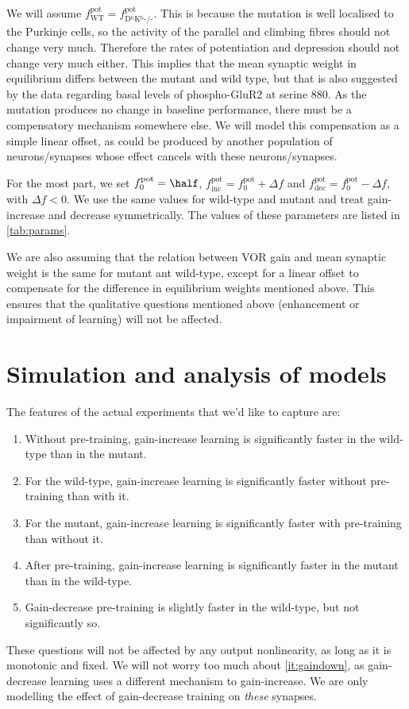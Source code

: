 \documentclass[12pt]{article}
\newcommand{\pot}{^{\text{pot}}}
\newcommand{\norm}{_0}
\newcommand{\inc}{_{\text{inc}}}
\newcommand{\dec}{_{\text{dec}}}
\newcommand{\wt}{_{\text{WT}}}
\newcommand{\ko}{_{\text{D$^\mathrm{b}$K$^\mathrm{b}$-/-}}}
\begin{document}
We will assume $f\pot\wt=f\pot\ko$.
This is because the mutation is well localised to the Purkinje cells, so the activity of the parallel and climbing fibres should not change very much.
Therefore the rates of potentiation and depression should not change very much either.
This implies that the mean synaptic weight in equilibrium differs between the mutant and wild type, but that is also suggested by the data regarding basal levels of phospho-GluR2 at serine 880.
As the mutation produces no change in baseline performance, there must be a compensatory mechanism somewhere else.
We will model this compensation as a simple linear offset, as could be produced by another population of neurons/synapses whose effect cancels with these neurons/synapses.

For the most part, we set $f\pot\norm=\half$, $f\pot\inc=f\pot\norm+\Delta f$ and $f\pot\dec=f\pot\norm-\Delta f$, with $\Delta f<0$.
We use the same values for wild-type and mutant and treat gain-increase and decrease symmetrically.
The values of these parameters are listed in \autoref{tab:params}.

We are also assuming that the relation between VOR gain and mean synaptic weight is the same for mutant ant wild-type, except for a linear offset to compensate for the difference in equilibrium weights mentioned above.
This ensures that the qualitative questions mentioned above (enhancement or impairment of learning) will not be affected.




\section{Simulation and analysis of models}\label{sec:results}

The features of the actual experiments that we'd like to capture are:
\begin{enumerate}
  \item Without pre-training, gain-increase learning is significantly faster in the wild-type than in the mutant.
  \item For the wild-type, gain-increase learning is significantly faster without pre-training than with it.
  \item For the mutant, gain-increase learning is significantly faster with pre-training than without it.
  \item After pre-training, gain-increase learning is significantly faster in the mutant than in the wild-type.
  \item Gain-decrease pre-training is slightly faster in the wild-type, but not significantly so.\label{it:gaindown}
\end{enumerate}
These questions will not be affected by any output nonlinearity, as long as it is monotonic and fixed.
We will not worry too much about \autoref{it:gaindown}, as gain-decrease learning uses a different mechanism to gain-increase.
We are only modelling the effect of gain-decrease training on \emph{these} synapses.
\end{document}
